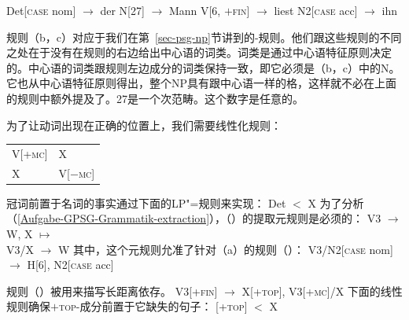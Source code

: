 \eal
\ex Det[\textsc{case} nom] $\to$ der
\ex N[27] $\to$ Mann
\ex V[6, $+$\textsc{fin}] $\to$ liest
\ex N2[\textsc{case} acc] $\to$ ihn
\zl

\noindent
规则（b，c）对应于我们在第~\ref{sec-psg-np}节讲到的\xbar-规则。他们跟这些规则的不同之处在于没有在规则的右边给出中心语的词类。词类是通过中心语特征原则决定的。中心语的词类跟规则左边成分的词类保持一致，即它必须是（b，c）中的N。它也从中心语特征原则得出，整个NP具有跟中心语一样的格，这样就不必在上面的规则中额外提及了。27是一个次范畴。这个数字是任意的。

为了让动词出现在正确的位置上，我们需要线性化规则：
\ea
\begin{tabular}[t]{@{}l@{~$<$~}l@{}}
V[+\textsc{mc}]  & X\\
X       & V[$-$\textsc{mc}]\\
\end{tabular}
\z
冠词前置于名词的事实通过下面的LP"=规则来实现：
\ea
{}Det $<$ X
\z
为了分析（\ref{Aufgabe-GPSG-Grammatik-extraction}），（）的提取元规则是必须的：
\ea
V3  $\to$ W, X $\mapsto$\\
V3/X  $\to$ W
\z
其中，这个元规则允准了针对（a）的规则（）：
\ea
V3/N2[\textsc{case} nom]  $\to$ H[6],  N2[\textsc{case} acc] 
\z

\noindent
规则（）被用来描写长距离依存。
\ea
V3[+\textsc{fin}] $\to$ X[+\textsc{top}], V3[+\textsc{mc}]/X
\z
下面的线性规则确保$+$\textsc{top}-成分前置于它缺失的句子：
\ea
{}[+\textsc{top}] $<$ X
\z

